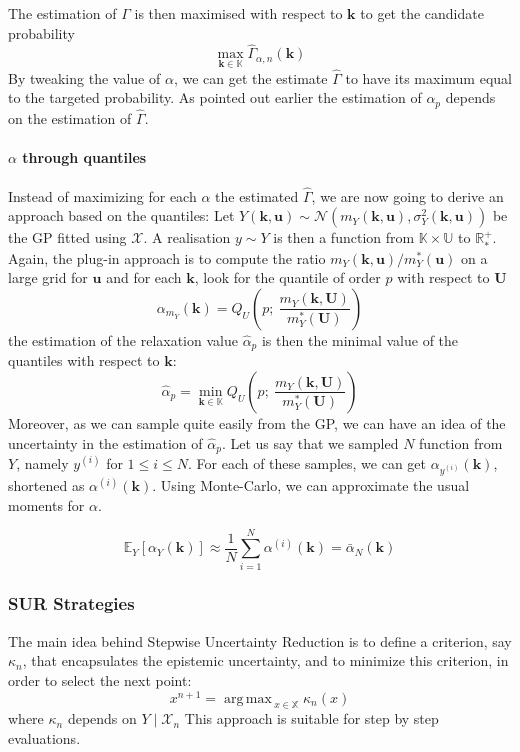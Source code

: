 \documentclass[a4paper,11pt]{article}
\newcommand{\Ex}{\mathbb{E}}
\newcommand{\Kspace}{\mathbb{K}}
\newcommand{\Uspace}{\mathbb{U}}
\newcommand{\Xspace}{\mathbb{X}}
\newcommand{\kk}{\mathbf{k}}
\newcommand{\uu}{\mathbf{u}}
\newcommand{\UU}{\mathbf{U}}
\DeclareMathOperator*{\argmax}{arg\,max \,}
\theoremstyle{defi}
\numberwithin{thmCounter}{section}
\begin{document}
The estimation of $\Gamma$ is then maximised with respect to $\kk$ to get the candidate probability
\begin{equation}
\max_{\kk\in\Kspace}  \hat{\Gamma}_{\alpha,n}(\kk) 
\end{equation}
By tweaking the value of $\alpha$, we can get the estimate $\hat{\Gamma}$ to have its maximum equal to the targeted probability. 
As pointed out earlier the estimation of $\alpha_p$ depends on the estimation of $\hat{\Gamma}$.
\paragraph{$\alpha$ through quantiles}
Instead of maximizing for each $\alpha$ the estimated $\hat{\Gamma}$, we are now going to derive an approach based on the quantiles:
Let $Y(\kk, \uu) \sim \mathcal{N}(m_Y(\kk,\uu), \sigma^2_{Y}(\kk, \uu))$ be the GP fitted using $\mathcal{X}$. A realisation $y\sim Y$ is then a function from $\Kspace \times \Uspace$ to $\mathbb{R}^{+}_*$.
Again, the plug-in approach is to compute the ratio $m_Y(\kk, \uu) / m^*_Y(\uu)$ on a large grid for $\uu$ and for each $\kk$, look for the quantile of order $p$ with respect to $\UU$
\begin{equation}
  \alpha_{m_{Y}}(\kk) = Q_{U}\left(p;~\frac{m_Y(\kk, \UU)}{m^*_Y(\UU)}\right)
\end{equation}
the estimation of the relaxation value $\hat{\alpha}_p$ is then the minimal value of the quantiles with respect to $\kk$:
\begin{equation}
    \label{eq:def_plugin_alpha}
  \hat{\alpha}_p = \min_{\kk \in \Kspace} Q_U\left(p;~\frac{m_Y(\kk, \UU)}{m^*_Y(\UU)}\right)  \tag{plug-in}
\end{equation}
Moreover, as we can sample quite easily from the GP, we can have an idea of the uncertainty in the estimation of $\hat{\alpha}_p$.
Let us say that we sampled $N$ function from $Y$, namely $y^{(i)}$ for $1 \leq i \leq N$. For each of these samples, we can get $\alpha_{y^{(i)}}(\kk)$, shortened as $\alpha^{(i)}(\kk)$. Using Monte-Carlo, we can approximate the usual moments for $\alpha$.

\begin{equation}
 \Ex_{Y}\left[\alpha_{Y}(\kk) \right] \approx \frac{1}{N} \sum_{i=1}^N \alpha^{(i)}(\kk) = \bar{\alpha}_N(\kk)
\end{equation}
$
$




\subsubsection{SUR Strategies}
The main idea behind Stepwise Uncertainty Reduction is to define a criterion, say $\kappa_n$, that encapsulates the epistemic uncertainty, and to minimize this criterion, in order to select the next point:
\begin{equation}
  x^{n+1} = \argmax_{x\in\Xspace} \kappa_n(x)
\end{equation}
where $\kappa_n$ depends on $Y\mid \mathcal{X}_n$
This approach is suitable for step by step evaluations.
\end{document}
